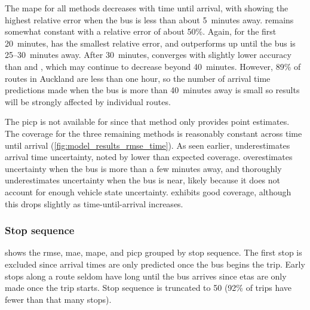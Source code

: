 The \gls{mape} for all methods decreases with time until arrival, with \Fhist{} showing the highest relative error when the bus is less than about 5~minutes away. \Fnorm{} remains somewhat constant with a relative error of about 50\%. Again, for the first 20~minutes, \Fpf{} has the smallest relative error, and outperforms \Fsched{} up until the bus is 25--30~minutes away. After 30~minutes, \Fpf{} converges with slightly lower accuracy than \Fhist{} and \Fsched{}, which may continue to decrease beyond 40~minutes. However, 89\% of routes in Auckland are less than one hour, so the number of arrival time predictions made when the bus is more than 40~minutes away is small so results will be strongly affected by individual routes.


The \gls{picp} is not available for \Fsched{} since that method only provides point estimates. The coverage for the three remaining methods is reasonably constant across time until arrival (\cref{fig:model_results_rmse_time}). As seen earlier, \Fpf{} underestimates arrival time uncertainty, noted by lower than expected coverage. \Fnorm{} overestimates uncertainty when the bus is more than a few minutes away, and thoroughly underestimates uncertainty when the bus is near, likely because it does not account for enough vehicle state uncertainty. \Fhist{} exhibits good coverage, although this drops slightly as time-until-arrival increases.


\subsubsection{Stop sequence}

 shows the \gls{rmse}, \gls{mae}, \gls{mape}, and \gls{picp} grouped by stop sequence. The first stop is excluded since arrival times are only predicted once the bus begins the trip. Early stops along a route seldom have long until the bus arrives since \glspl{eta} are only made once the trip starts. Stop sequence is truncated to 50 (92\% of trips have fewer than that many stops).


